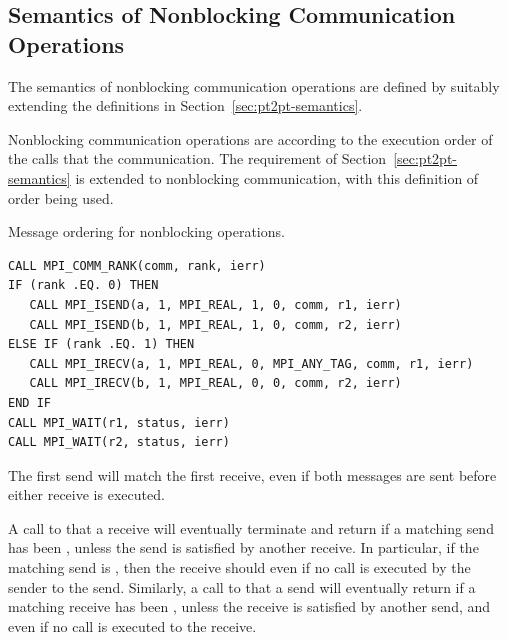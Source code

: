 \subsection{Semantics of Nonblocking Communication Operations}
\label{subsec:pt2pt-semantics}



The semantics of nonblocking communication operations are defined by suitably extending the
definitions in Section~\ref{sec:pt2pt-semantics}.

Nonblocking communication operations are  according to the execution
order of the calls that  the communication.
The 
requirement of Section~\ref{sec:pt2pt-semantics} is extended to
nonblocking communication, with this definition of order being used.

\begin{example}
\label{pt2pt-exL}
%
%
Message ordering for nonblocking operations.
\begin{lstlisting}[language={[MPI]Fortran}]
CALL MPI_COMM_RANK(comm, rank, ierr)
IF (rank .EQ. 0) THEN
   CALL MPI_ISEND(a, 1, MPI_REAL, 1, 0, comm, r1, ierr)
   CALL MPI_ISEND(b, 1, MPI_REAL, 1, 0, comm, r2, ierr)
ELSE IF (rank .EQ. 1) THEN
   CALL MPI_IRECV(a, 1, MPI_REAL, 0, MPI_ANY_TAG, comm, r1, ierr)
   CALL MPI_IRECV(b, 1, MPI_REAL, 0, 0, comm, r2, ierr)
END IF
CALL MPI_WAIT(r1, status, ierr)
CALL MPI_WAIT(r2, status, ierr)
\end{lstlisting}
The first send will match the
first receive, even
if both messages are sent before either receive is executed.
\end{example}

A call to  that  a receive will eventually
terminate and return if a matching send has been , unless
the send is satisfied by another receive.  In particular, if the matching send
is
,
then the receive should  even if no call is executed by the
sender to  the send.  Similarly, a call to  that
 a send will eventually
return if a matching receive has been , unless
the receive is satisfied by another send, and even if no call is executed to
 the receive.


